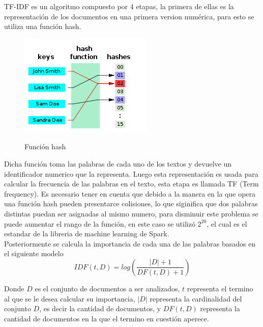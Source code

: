 \documentclass[conference,compsoc]{IEEEtran}
\begin{document}
TF-IDF es un algoritmo compuesto por 4 etapas, la primera de ellas es la
representación de los documentos en una primera version numérica, para esto
se utiliza una función hash.

\begin{figure}[H]
    \centering
    \includegraphics[scale=0.6]{hash.png}
    \caption{Función hash} \cite{hash}
\end{figure}

Dicha función toma las palabras de cada uno de los textos y devuelve un
identificador numerico que la representa. Luego esta representación es usada
para calcular la frecuencia de las palabras en el texto, esta etapa es llamada
TF (Term frequency). Es necesario tener en cuenta que debido a la manera en la
que opera una función hash pueden presentarce colisiones, lo que siginifica
que dos palabras distintas puedan ser asignadas al mismo numero, para disminuir
este problema se puede aumentar el rango de la función, en este caso
se utilizó $2^{20}$, el cual es el estandar de la libreria de machine learning
de Spark.\\

Posteriormente se calcula la importancia de cada una de las palabras basados en
el siguiente modelo\\

\begin{equation}
    IDF(t,D) = log \left( \frac{|D| + 1}{DF(t,D) + 1} \right)
\end{equation}

\vspace{0.5cm}

Donde $D$ es el conjunto de documentos a ser analizados, $t$ representa el
termino al que se le desea calcular su importancia, $|D|$ representa la
cardinalidad del conjunto $D$, es decir la cantidad de documentos, y $DF(t,D)$
representa la cantidad de documentos en la que el termino en cuestión aperece.\\
\end{document}

